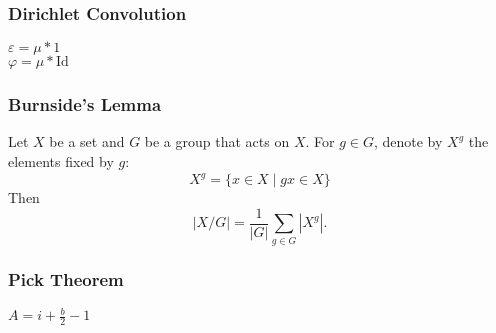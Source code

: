 \subsubsection{Dirichlet Convolution}
    $\varepsilon = \mu * 1$\\
    $\varphi = \mu * \text{Id}$
\subsubsection{Burnside's Lemma}
Let $X$ be a set and $G$ be a group that acts on $X$.
For $g \in G$, denote by $X^g$ the elements fixed by $g$:
\[
X^g = \{ x \in X \mid gx \in X \}
\]
Then
\[
|X/G| = \frac{1}{|G|} \sum_{g \in G} |X^g|.
\]
\subsubsection{Pick Theorem}
    $A = i + \frac{b}{2} - 1$
